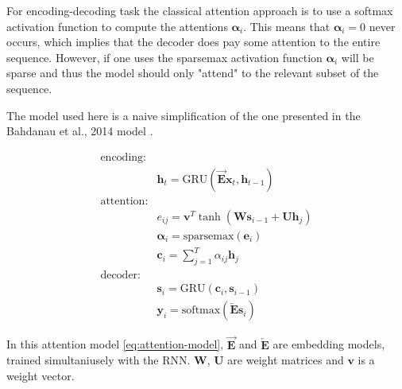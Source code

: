 For encoding-decoding task the classical attention approach is to use a softmax activation function to compute the attentions ${\boldsymbol\alpha}_i$. This means that ${\boldsymbol\alpha}_i=0$ never occurs, which implies that the decoder does pay some attention to the entire sequence. However, if one uses the sparsemax activation function ${\boldsymbol\alpha}_i$ will be sparse and thus the model should only "attend" to the relevant subset of the sequence.

The model used here is a naive simplification of the one presented in the Bahdanau et al., 2014 model \cite{attention}.

\begin{equation}
\begin{aligned}
\text{encoding:} & \\
& \mathbf{h}_t = \mathrm{GRU}(\overrightarrow{\mathbf{E}} \mathbf{x}_t, \mathbf{h}_{t-1}) \\
\text{attention:} & \\
& e_{ij} = \mathbf{v}^T \tanh(\mathbf{W} \mathbf{s}_{i-1} + \mathbf{U} \mathbf{h}_j) \\
& {\boldsymbol\alpha}_i = \mathrm{sparsemax}(\mathbf{e}_i) \\
& \mathbf{c}_i = {\textstyle \sum_{j=1}^T} \alpha_{ij} \mathbf{h}_j \\
\text{decoder:} & \\
&\mathbf{s}_i = \mathrm{GRU}(\mathbf{c}_i, \mathbf{s}_{i-1}) \\
&\mathbf{y}_i = \mathrm{softmax}(\overleftarrow{\mathbf{E}} \mathbf{s}_i)
\end{aligned}
\label{eq:attention-model}
\end{equation}

In this attention model \eqref{eq:attention-model}, $\overrightarrow{\mathbf{E}}$ and $\overleftarrow{\mathbf{E}}$ are embedding models, trained simultaniusely with the RNN. $\mathbf{W}$, $\mathbf{U}$ are weight matrices and $\mathbf{v}$ is a weight vector.
